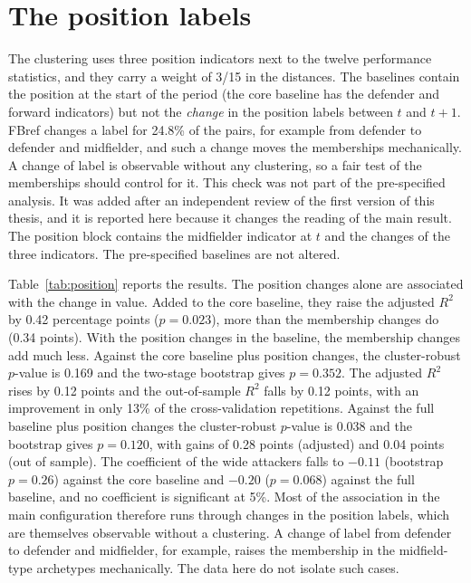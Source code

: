 \section{The position labels}
\label{sec:results-position}

The clustering uses three position indicators next to the twelve performance statistics, and they carry a weight of 3/15 in the distances. The baselines contain the position at the start of the period (the core baseline has the defender and forward indicators) but not the \emph{change} in the position labels between $t$ and $t+1$. FBref changes a label for 24.8\% of the pairs, for example from defender to defender and midfielder, and such a change moves the memberships mechanically. A change of label is observable without any clustering, so a fair test of the memberships should control for it. This check was not part of the pre-specified analysis. It was added after an independent review of the first version of this thesis, and it is reported here because it changes the reading of the main result. The position block contains the midfielder indicator at $t$ and the changes of the three indicators. The pre-specified baselines are not altered.

Table~\ref{tab:position} reports the results. The position changes alone are associated with the change in value. Added to the core baseline, they raise the adjusted $R^2$ by 0.42 percentage points ($p=0.023$), more than the membership changes do (0.34 points). With the position changes in the baseline, the membership changes add much less. Against the core baseline plus position changes, the cluster-robust $p$-value is 0.169 and the two-stage bootstrap gives $p=0.352$. The adjusted $R^2$ rises by 0.12 points and the out-of-sample $R^2$ falls by 0.12 points, with an improvement in only 13\% of the cross-validation repetitions. Against the full baseline plus position changes the cluster-robust $p$-value is 0.038 and the bootstrap gives $p=0.120$, with gains of 0.28 points (adjusted) and 0.04 points (out of sample). The coefficient of the wide attackers falls to $-0.11$ (bootstrap $p=0.26$) against the core baseline and $-0.20$ ($p=0.068$) against the full baseline, and no coefficient is significant at 5\%. Most of the association in the main configuration therefore runs through changes in the position labels, which are themselves observable without a clustering. A change of label from defender to defender and midfielder, for example, raises the membership in the midfield-type archetypes mechanically. The data here do not isolate such cases.

